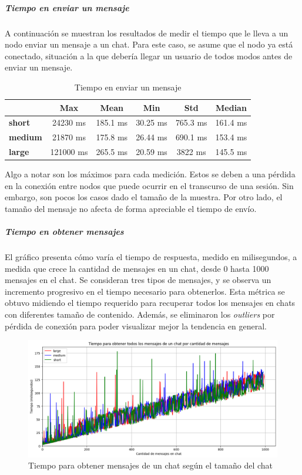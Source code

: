 \subparagraph{Tiempo en enviar un mensaje}

A continuación se muestran los resultados de medir el tiempo que le lleva a un nodo enviar un mensaje a un chat. Para este caso, se asume que el nodo ya está conectado, situación a la que debería llegar un usuario de todos modos antes de enviar un mensaje.

\setlength\tabcolsep{10pt}
\begin{table}[!htbp]
    \centering
    \begin{tabular}{|l|c|c|c|c|c|}
        \hline
        & \textbf{Max} & \textbf{Mean} & \textbf{Min} & \textbf{Std} & \textbf{Median} \\ \hline
        \textbf{short} & 24230 ms & 185.1 ms & 30.25 ms & 765.3 ms & 161.4 ms \\ \hline
        \textbf{medium} & 21870 ms & 175.8 ms & 26.44 ms & 690.1 ms & 153.4 ms \\ \hline
        \textbf{large} & 121000 ms & 265.5 ms & 20.59 ms & 3822 ms & 145.5 ms \\ \hline
    \end{tabular}
    \caption{Tiempo en enviar un mensaje}
\end{table}

Algo a notar son los máximos para cada medición. Estos se deben a una pérdida en la conexión entre nodos que puede ocurrir en el transcurso de una sesión. Sin embargo, son pocos los casos dado el tamaño de la muestra. Por otro lado, el tamaño del mensaje no afecta de forma apreciable el tiempo de envío.

\subparagraph{Tiempo en obtener mensajes}

El gráfico presenta cómo varía el tiempo de respuesta, medido en milisegundos, a medida que crece la cantidad de mensajes en un chat, desde 0 hasta 1000 mensajes en el chat. Se consideran tres tipos de mensajes, y se observa un incremento progresivo en el tiempo necesario para obtenerlos. Esta métrica se obtuvo midiendo el tiempo requerido para recuperar todos los mensajes en chats con diferentes tamaño de contenido. Además, se eliminaron los \textit{outliers} por pérdida de conexión para poder visualizar mejor la tendencia en general.

\begin{figure}[H]
    \centering
    \includegraphics[width=1\linewidth]{img/metricas-ipfs/tiempo-para-obtener-por-cant-msjs.png}
    \caption{Tiempo para obtener mensajes de un chat según el tamaño del chat}
    \label{fig:ipfs-get-message-graphic.png}
\end{figure}

